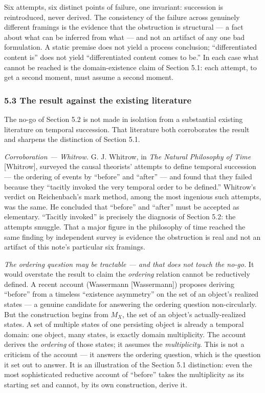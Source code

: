 \documentclass[
]{article}
\begin{document}
Six attempts, six distinct points of failure, one invariant: succession
is reintroduced, never derived. The consistency of the failure across
genuinely different framings is the evidence that the obstruction is
structural --- a fact about what can be inferred from what --- and not
an artifact of any one bad formulation. A static premise does not yield
a process conclusion; ``differentiated content is'' does not yield
``differentiated content comes to be.'' In each case what cannot be
reached is the domain-existence claim of Section 5.1: each attempt, to
get a second moment, must assume a second moment.

\hypertarget{the-result-against-the-existing-literature}{%
\subsubsection{5.3 The result against the existing
literature}\label{the-result-against-the-existing-literature}}

The no-go of Section 5.2 is not made in isolation from a substantial
existing literature on temporal succession. That literature both
corroborates the result and sharpens the distinction of Section 5.1.

\emph{Corroboration --- Whitrow.} G. J. Whitrow, in \emph{The Natural
Philosophy of Time} {[}Whitrow{]}, surveyed the causal theorists'
attempts to define temporal succession --- the ordering of events by
``before'' and ``after'' --- and found that they failed because they
``tacitly invoked the very temporal order to be defined.'' Whitrow's
verdict on Reichenbach's mark method, among the most ingenious such
attempts, was the same. He concluded that ``before'' and ``after'' must
be accepted as elementary. ``Tacitly invoked'' is precisely the
diagnosis of Section 5.2: the attempts smuggle. That a major figure in
the philosophy of time reached the same finding by independent survey is
evidence the obstruction is real and not an artifact of this note's
particular six framings.

\emph{The ordering question may be tractable --- and that does not touch
the no-go.} It would overstate the result to claim the \emph{ordering}
relation cannot be reductively defined. A recent account (Wassermann
{[}Wassermann{]}) proposes deriving ``before'' from a timeless
``existence asymmetry'' on the set of an object's realized states --- a
genuine candidate for answering the ordering question non-circularly.
But the construction begins from \(M_X\), the set of an object's
actually-realized states. A set of multiple states of one persisting
object is already a temporal domain: one object, many states, is exactly
domain multiplicity. The account derives the \emph{ordering} of those
states; it assumes the \emph{multiplicity}. This is not a criticism of
the account --- it answers the ordering question, which is the question
it set out to answer. It is an illustration of the Section 5.1
distinction: even the most sophisticated reductive account of ``before''
takes the multiplicity as its starting set and cannot, by its own
construction, derive it.
\end{document}

